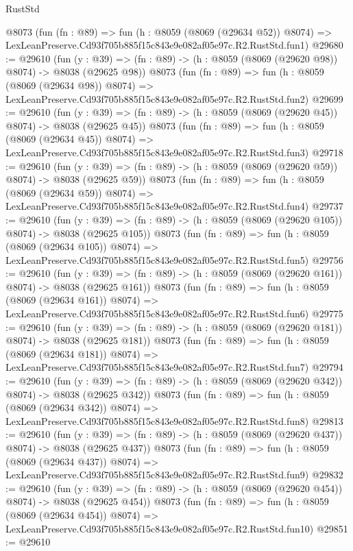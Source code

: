 \begin{lexlean}{RustStd}
\begin{coremodule}
    @8073
    (fun (fn : @89) =>
    fun (h : @8059 (@8069 (@29634 @52)) @8074) =>
    LexLeanPreserve.Cd93f705b885f15c843e9e082af05e97c.R2.RustStd.fun1)
@29680 := @29610
    (fun (y : @39) => (fn : @89) -> (h : @8059 (@8069 (@29620 @98)) @8074) -> @8038 (@29625 @98))
    @8073
    (fun (fn : @89) =>
    fun (h : @8059 (@8069 (@29634 @98)) @8074) =>
    LexLeanPreserve.Cd93f705b885f15c843e9e082af05e97c.R2.RustStd.fun2)
@29699 := @29610
    (fun (y : @39) => (fn : @89) -> (h : @8059 (@8069 (@29620 @45)) @8074) -> @8038 (@29625 @45))
    @8073
    (fun (fn : @89) =>
    fun (h : @8059 (@8069 (@29634 @45)) @8074) =>
    LexLeanPreserve.Cd93f705b885f15c843e9e082af05e97c.R2.RustStd.fun3)
@29718 := @29610
    (fun (y : @39) => (fn : @89) -> (h : @8059 (@8069 (@29620 @59)) @8074) -> @8038 (@29625 @59))
    @8073
    (fun (fn : @89) =>
    fun (h : @8059 (@8069 (@29634 @59)) @8074) =>
    LexLeanPreserve.Cd93f705b885f15c843e9e082af05e97c.R2.RustStd.fun4)
@29737 := @29610
    (fun (y : @39) => (fn : @89) -> (h : @8059 (@8069 (@29620 @105)) @8074) -> @8038 (@29625 @105))
    @8073
    (fun (fn : @89) =>
    fun (h : @8059 (@8069 (@29634 @105)) @8074) =>
    LexLeanPreserve.Cd93f705b885f15c843e9e082af05e97c.R2.RustStd.fun5)
@29756 := @29610
    (fun (y : @39) => (fn : @89) -> (h : @8059 (@8069 (@29620 @161)) @8074) -> @8038 (@29625 @161))
    @8073
    (fun (fn : @89) =>
    fun (h : @8059 (@8069 (@29634 @161)) @8074) =>
    LexLeanPreserve.Cd93f705b885f15c843e9e082af05e97c.R2.RustStd.fun6)
@29775 := @29610
    (fun (y : @39) => (fn : @89) -> (h : @8059 (@8069 (@29620 @181)) @8074) -> @8038 (@29625 @181))
    @8073
    (fun (fn : @89) =>
    fun (h : @8059 (@8069 (@29634 @181)) @8074) =>
    LexLeanPreserve.Cd93f705b885f15c843e9e082af05e97c.R2.RustStd.fun7)
@29794 := @29610
    (fun (y : @39) => (fn : @89) -> (h : @8059 (@8069 (@29620 @342)) @8074) -> @8038 (@29625 @342))
    @8073
    (fun (fn : @89) =>
    fun (h : @8059 (@8069 (@29634 @342)) @8074) =>
    LexLeanPreserve.Cd93f705b885f15c843e9e082af05e97c.R2.RustStd.fun8)
@29813 := @29610
    (fun (y : @39) => (fn : @89) -> (h : @8059 (@8069 (@29620 @437)) @8074) -> @8038 (@29625 @437))
    @8073
    (fun (fn : @89) =>
    fun (h : @8059 (@8069 (@29634 @437)) @8074) =>
    LexLeanPreserve.Cd93f705b885f15c843e9e082af05e97c.R2.RustStd.fun9)
@29832 := @29610
    (fun (y : @39) => (fn : @89) -> (h : @8059 (@8069 (@29620 @454)) @8074) -> @8038 (@29625 @454))
    @8073
    (fun (fn : @89) =>
    fun (h : @8059 (@8069 (@29634 @454)) @8074) =>
    LexLeanPreserve.Cd93f705b885f15c843e9e082af05e97c.R2.RustStd.fun10)
@29851 := @29610

\end{coremodule}
\end{lexlean}
